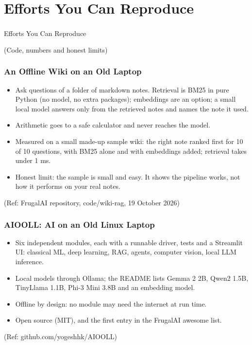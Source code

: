 
\section[Efforts]{Efforts You Can Reproduce}

\begin{frame}[fragile]\frametitle{}
\begin{center}
{\Large Efforts You Can Reproduce}

\medskip
{\small (Code, numbers and honest limits)}
\end{center}
\end{frame}

\begin{frame}[fragile]\frametitle{An Offline Wiki on an Old Laptop}
\begin{itemize}
\item Ask questions of a folder of markdown notes. Retrieval is BM25 in pure Python (no model, no extra packages); embeddings are an option; a small local model answers only from the retrieved notes and names the note it used.
\item Arithmetic goes to a safe calculator and never reaches the model.
\item Measured on a small made-up sample wiki: the right note ranked first for 10 of 10 questions, with BM25 alone and with embeddings added; retrieval takes under 1 ms.
\item Honest limit: the sample is small and easy. It shows the pipeline works, not how it performs on your real notes.
\end{itemize}
{\tiny (Ref: FrugalAI repository, code/wiki-rag, 19 October 2026)}
\end{frame}

\begin{frame}[fragile]\frametitle{AIOOLL: AI on an Old Linux Laptop}
\begin{itemize}
\item Six independent modules, each with a runnable driver, tests and a Streamlit UI: classical ML, deep learning, RAG, agents, computer vision, local LLM inference.
\item Local models through Ollama; the README lists Gemma 2 2B, Qwen2 1.5B, TinyLlama 1.1B, Phi-3 Mini 3.8B and an embedding model.
\item Offline by design: no module may need the internet at run time.
\item Open source (MIT), and the first entry in the FrugalAI awesome list.
\end{itemize}
{\tiny (Ref: github.com/yogeshhk/AIOOLL)}
\end{frame}

